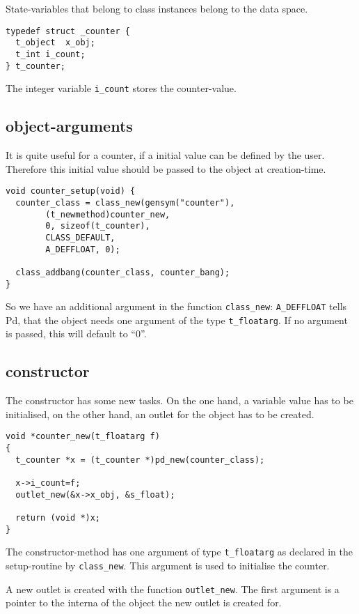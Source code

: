\documentclass[12pt, a4paper,english,titlepage]{article}
\begin{document}
State-variables that belong to class instances belong to the data space.

\begin{verbatim}
typedef struct _counter {
  t_object  x_obj;
  t_int i_count;
} t_counter;
\end{verbatim}

The integer variable \verb+i_count+ stores the counter-value.

\subsection{object-arguments}
It is quite useful for a counter, if a initial value can be defined by the user.
Therefore this initial value should be passed to the object at creation-time.

\begin{verbatim}
void counter_setup(void) {
  counter_class = class_new(gensym("counter"),
        (t_newmethod)counter_new,
        0, sizeof(t_counter),
        CLASS_DEFAULT,
        A_DEFFLOAT, 0);

  class_addbang(counter_class, counter_bang);
}
\end{verbatim}

So we have an additional argument in the function \verb+class_new+:
\verb+A_DEFFLOAT+ tells Pd, that the object needs one argument of the 
type \verb+t_floatarg+.
If no argument is passed, this will default to ``0''.

\subsection{constructor}
The constructor has some new tasks.
On the one hand, a variable value has to be initialised,
on the other hand, an outlet for the object has to be created.

\begin{verbatim}
void *counter_new(t_floatarg f)
{
  t_counter *x = (t_counter *)pd_new(counter_class);

  x->i_count=f;
  outlet_new(&x->x_obj, &s_float);

  return (void *)x;
}
\end{verbatim}

The constructor-method has one argument of type \verb+t_floatarg+ as declared
in the setup-routine by \verb+class_new+.
This argument is used to initialise the counter.

A new outlet is created with the function \verb+outlet_new+.
The first argument is a pointer to the interna of the object
the new outlet is created for.
\end{document}

